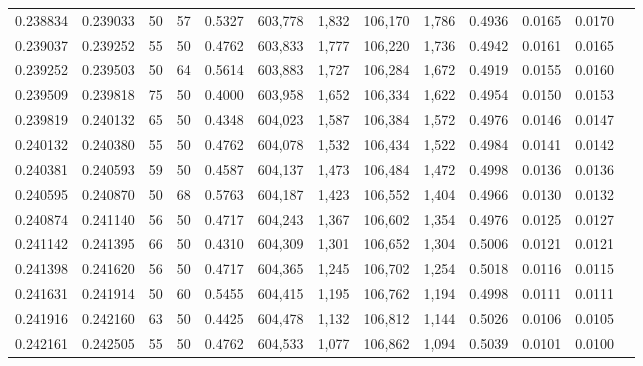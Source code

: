\begin{tabular}{rrrrrrrrrrrrr}
0.238834 & 0.239033 &    50 &  57 &                                     0.5327 & 603,778 &   1,832 & 106,170 &   1,786 & 0.4936 & 0.0165 & 0.0170 \\
0.239037 & 0.239252 &    55 &  50 &                                     0.4762 & 603,833 &   1,777 & 106,220 &   1,736 & 0.4942 & 0.0161 & 0.0165 \\
0.239252 & 0.239503 &    50 &  64 &                                     0.5614 & 603,883 &   1,727 & 106,284 &   1,672 & 0.4919 & 0.0155 & 0.0160 \\
0.239509 & 0.239818 &    75 &  50 &                                     0.4000 & 603,958 &   1,652 & 106,334 &   1,622 & 0.4954 & 0.0150 & 0.0153 \\
0.239819 & 0.240132 &    65 &  50 &                                     0.4348 & 604,023 &   1,587 & 106,384 &   1,572 & 0.4976 & 0.0146 & 0.0147 \\
0.240132 & 0.240380 &    55 &  50 &                                     0.4762 & 604,078 &   1,532 & 106,434 &   1,522 & 0.4984 & 0.0141 & 0.0142 \\
0.240381 & 0.240593 &    59 &  50 &                                     0.4587 & 604,137 &   1,473 & 106,484 &   1,472 & 0.4998 & 0.0136 & 0.0136 \\
0.240595 & 0.240870 &    50 &  68 &                                     0.5763 & 604,187 &   1,423 & 106,552 &   1,404 & 0.4966 & 0.0130 & 0.0132 \\
0.240874 & 0.241140 &    56 &  50 &                                     0.4717 & 604,243 &   1,367 & 106,602 &   1,354 & 0.4976 & 0.0125 & 0.0127 \\
0.241142 & 0.241395 &    66 &  50 &                                     0.4310 & 604,309 &   1,301 & 106,652 &   1,304 & 0.5006 & 0.0121 & 0.0121 \\
0.241398 & 0.241620 &    56 &  50 &                                     0.4717 & 604,365 &   1,245 & 106,702 &   1,254 & 0.5018 & 0.0116 & 0.0115 \\
0.241631 & 0.241914 &    50 &  60 &                                     0.5455 & 604,415 &   1,195 & 106,762 &   1,194 & 0.4998 & 0.0111 & 0.0111 \\
0.241916 & 0.242160 &    63 &  50 &                                     0.4425 & 604,478 &   1,132 & 106,812 &   1,144 & 0.5026 & 0.0106 & 0.0105 \\
0.242161 & 0.242505 &    55 &  50 &                                     0.4762 & 604,533 &   1,077 & 106,862 &   1,094 & 0.5039 & 0.0101 & 0.0100 \\

\end{tabular}
